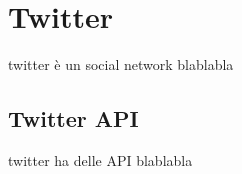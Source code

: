\chapter{Twitter}
twitter è un social network blablabla

\section{Twitter API}
	twitter ha delle API blablabla